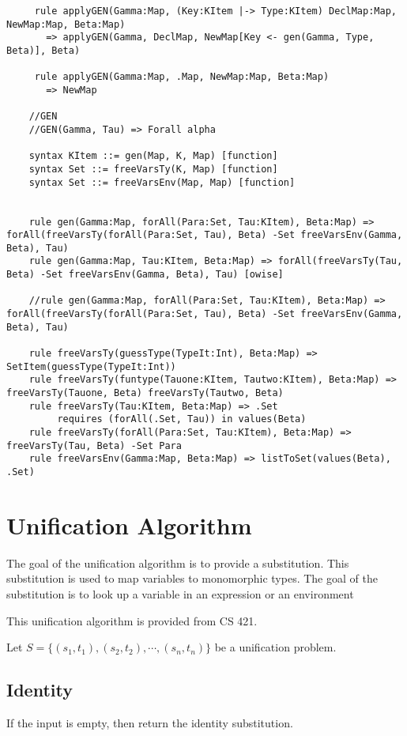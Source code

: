 \begin{lstlisting}
     rule applyGEN(Gamma:Map, (Key:KItem |-> Type:KItem) DeclMap:Map, NewMap:Map, Beta:Map)
       => applyGEN(Gamma, DeclMap, NewMap[Key <- gen(Gamma, Type, Beta)], Beta)

     rule applyGEN(Gamma:Map, .Map, NewMap:Map, Beta:Map)
       => NewMap

    //GEN
    //GEN(Gamma, Tau) => Forall alpha

    syntax KItem ::= gen(Map, K, Map) [function]
    syntax Set ::= freeVarsTy(K, Map) [function]
    syntax Set ::= freeVarsEnv(Map, Map) [function]


    rule gen(Gamma:Map, forAll(Para:Set, Tau:KItem), Beta:Map) => forAll(freeVarsTy(forAll(Para:Set, Tau), Beta) -Set freeVarsEnv(Gamma, Beta), Tau)
    rule gen(Gamma:Map, Tau:KItem, Beta:Map) => forAll(freeVarsTy(Tau, Beta) -Set freeVarsEnv(Gamma, Beta), Tau) [owise]

    //rule gen(Gamma:Map, forAll(Para:Set, Tau:KItem), Beta:Map) => forAll(freeVarsTy(forAll(Para:Set, Tau), Beta) -Set freeVarsEnv(Gamma, Beta), Tau)

    rule freeVarsTy(guessType(TypeIt:Int), Beta:Map) => SetItem(guessType(TypeIt:Int))
    rule freeVarsTy(funtype(Tauone:KItem, Tautwo:KItem), Beta:Map) => freeVarsTy(Tauone, Beta) freeVarsTy(Tautwo, Beta)
    rule freeVarsTy(Tau:KItem, Beta:Map) => .Set
         requires (forAll(.Set, Tau)) in values(Beta)
    rule freeVarsTy(forAll(Para:Set, Tau:KItem), Beta:Map) => freeVarsTy(Tau, Beta) -Set Para
    rule freeVarsEnv(Gamma:Map, Beta:Map) => listToSet(values(Beta), .Set)
\end{lstlisting}
\section{Unification Algorithm}

The goal of the unification algorithm is to provide a substitution. This substitution is used to map variables to monomorphic types. The goal of the substitution is to look up a variable in an expression or an environment 

This unification algorithm is provided from CS 421. \cite{CS421:Unif}

Let $S = \{(s_1 , t_1), (s_2 , t_2), \cdots, (s_n , t_n)\}$ be a
unification problem.

\subsection{Identity}
If the input is empty, then return the identity substitution.

